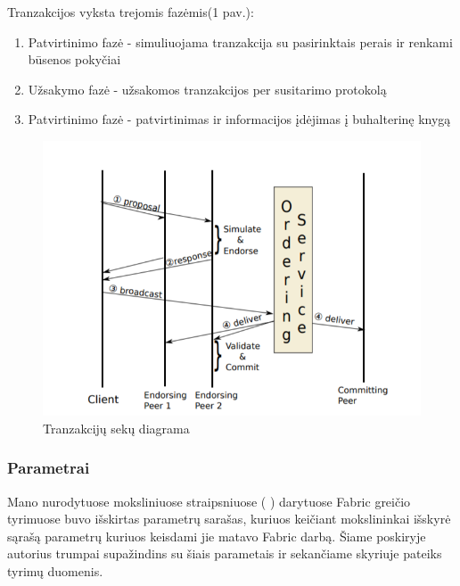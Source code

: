 \documentclass{VUMIFPSkursinis}
\begin{document}
Tranzakcijos vyksta trejomis fazėmis(1 pav.):
			\begin{enumerate}
				\item{Patvirtinimo fazė - simuliuojama tranzakcija su pasirinktais perais ir renkami būsenos pokyčiai}
				\item{Užsakymo fazė - užsakomos tranzakcijos per susitarimo protokolą}
				\item{Patvirtinimo fazė - patvirtinimas ir informacijos įdėjimas į buhalterinę knygą }
			\end{enumerate}

\begin{figure}[H]
    \centering
    \includegraphics[scale=0.5]{img/MLP}
    \caption{Tranzakcijų sekų diagrama}   %
    \label{img:mlp}
\end{figure}

				
		\subsubsection{Parametrai}

		Mano nurodytuose moksliniuose straipsniuose (\cite{ThailandPerf} \cite{IMBResearch}) darytuose Fabric greičio tyrimuose
		buvo išskirtas parametrų sarašas, kuriuos keičiant mokslininkai išskyrė sąrašą parametrų kuriuos keisdami jie matavo Fabric darbą. 
		Šiame poskiryje autorius trumpai supažindins su šiais parametais ir sekančiame skyriuje pateiks tyrimų duomenis.
			
\end{document}
